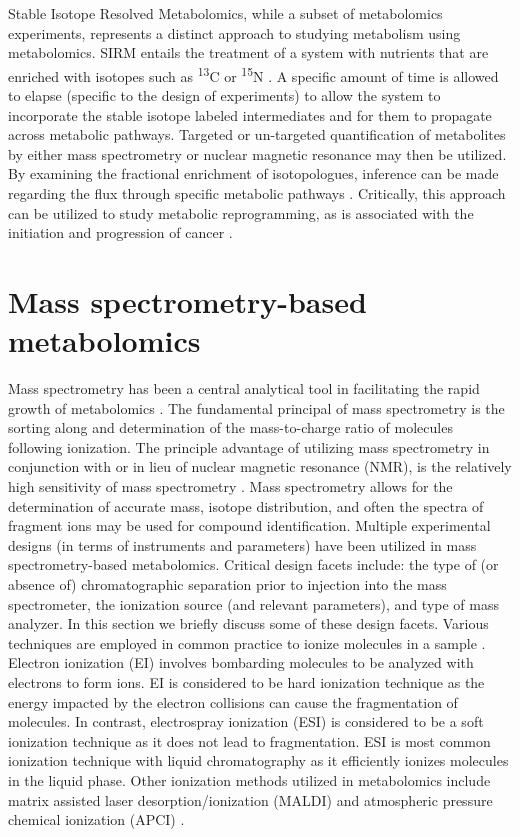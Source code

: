 \begin{DoubleSpace*}
Stable Isotope Resolved Metabolomics, while a subset of metabolomics experiments, represents a distinct approach to studying metabolism using metabolomics. SIRM entails the treatment of a system with nutrients that are enriched with isotopes such as \textsuperscript{13}C or \textsuperscript{15}N  \cite{bruntz2017, newgard2017,higashi2014,fan2012}. A specific amount of time is allowed to elapse (specific to the design of experiments) to allow the system to incorporate the stable isotope labeled intermediates and for them to propagate across metabolic pathways. Targeted or un-targeted quantification of metabolites by either mass spectrometry or nuclear magnetic resonance may then be utilized. By examining the fractional enrichment of isotopologues, inference can be made regarding the flux through specific metabolic pathways \cite{higashi2014,fan2012}. Critically, this approach can be utilized to study metabolic reprogramming, as is associated with the initiation and progression of cancer \cite{bruntz2017}.

\section{Mass spectrometry-based metabolomics}
Mass spectrometry has been a central analytical tool in facilitating the rapid growth of metabolomics \cite{dunn2013}. The fundamental principal of mass spectrometry is the sorting along and determination of the mass-to-charge ratio of molecules following ionization. The principle advantage of utilizing mass spectrometry in conjunction with or in lieu of nuclear magnetic resonance (NMR), is the relatively high sensitivity of mass spectrometry \cite{sumner2011,gowda2014,jurgen2017}. Mass spectrometry allows for the determination of accurate mass, isotope distribution, and often the spectra of fragment ions may be used for compound identification. Multiple experimental designs (in terms of instruments and parameters) have been utilized in mass spectrometry-based metabolomics. Critical design facets include: the type of (or absence of) chromatographic separation prior to injection into the mass spectrometer, the ionization source (and relevant parameters), and type of mass analyzer. In this section we briefly discuss some of these design facets. Various techniques are employed in common practice to ionize molecules in a sample \cite{sumner2011,gowda2014,jurgen2017}. Electron ionization (EI) involves bombarding molecules to be analyzed with electrons to form ions. EI is considered to be hard ionization technique as the energy impacted by the electron collisions can cause the fragmentation of molecules. In contrast, electrospray ionization (ESI) is considered to be a soft ionization technique as it does not lead to fragmentation. ESI is most common ionization technique with liquid chromatography as it efficiently ionizes molecules in the liquid phase. Other ionization methods utilized in metabolomics include matrix assisted laser desorption/ionization (MALDI) and atmospheric pressure chemical ionization (APCI) \cite{sumner2011}.


\end{DoubleSpace*}
